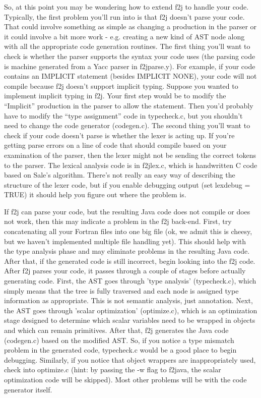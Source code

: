 \documentclass[11pt]{article}
\begin{document}
So, at this point you may be wondering how to extend f2j to handle your code.
Typically, the first problem you'll run into is that f2j doesn't parse your
code. That could involve something as simple as changing a production in the
parser or it could involve a bit more work - e.g. creating a new kind of AST
node along with all the appropriate code generation routines. The first thing
you'll want to check is whether the parser supports the syntax your code uses
(the parsing code is machine generated from a Yacc parser in f2jparse.y). For
example, if your code contains an IMPLICIT statement (besides IMPLICIT NONE),
your code will not compile because f2j doesn't support implicit typing. Suppose
you wanted to implement implicit typing in f2j. Your first step would be to
modify the ``Implicit'' production in the parser to allow the statement. Then
you'd probably have to modify the ``type assignment'' code in typecheck.c, but
you shouldn't need to change the code generator (codegen.c). The second thing
you'll want to check if your code doesn't parse is whether the lexer is acting
up. If you're getting parse errors on a line of code that should compile based
on your examination of the parser, then the lexer might not be sending the
correct tokens to the parser. The lexical analysis code is in f2jlex.c, which
is handwritten C code based on Sale's algorithm. There's not really an easy way
of describing the structure of the lexer code, but if you enable debugging
output (set lexdebug = TRUE) it should help you figure out where the problem
is.

If f2j can parse your code, but the resulting Java code does not compile or
does not work, then this may indicate a problem in the f2j back-end. First, try
concatenating all your Fortran files into one big file (ok, we admit this is
cheesy, but we haven't implemented multiple file handling yet). This should
help with the type analysis phase and may eliminate problems in the resulting
Java code. After that, if the generated code is still incorrect, begin looking
into the f2j code. After f2j parses your code, it passes through a couple of
stages before actually generating code. First, the AST goes through 'type
analysis' (typecheck.c), which simply means that the tree is fully traversed
and each node is assigned type information as appropriate. This is not semantic
analysis, just annotation. Next, the AST goes through 'scalar optimization'
(optimize.c), which is an optimization stage designed to determine which scalar
variables need to be wrapped in objects and which can remain primitives. After
that, f2j generates the Java code (codegen.c) based on the modified AST. So, if
you notice a type mismatch problem in the generated code, typecheck.c would be
a good place to begin debugging. Similarly, if you notice that object wrappers
are inappropriately used, check into optimize.c (hint: by passing the -w flag
to f2java, the scalar optimization code will be skipped). Most other problems
will be with the code generator itself.
\end{document}
